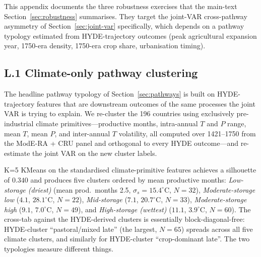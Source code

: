 \documentclass[11pt,letterpaper]{article}
\begin{document}
This appendix documents the three robustness exercises that the main-text Section~\ref{sec:robustness} summarises. They target the joint-VAR cross-pathway asymmetry of Section~\ref{sec:joint-var} specifically, which depends on a pathway typology estimated from HYDE-trajectory outcomes (peak agricultural expansion year, 1750-era density, 1750-era crop share, urbanisation timing).

\subsection*{L.1 Climate-only pathway clustering}
\label{app:joint-var-climate-clusters}

The headline pathway typology of Section~\ref{sec:pathways} is built on HYDE-trajectory features that are downstream outcomes of the same processes the joint VAR is trying to explain. We re-cluster the 196 countries using exclusively pre-industrial climate primitives---productive months, intra-annual $T$ and $P$ range, mean $T$, mean $P$, and inter-annual $T$ volatility, all computed over 1421--1750 from the ModE-RA + CRU panel and orthogonal to every HYDE outcome---and re-estimate the joint VAR on the new cluster labels.

K=5 KMeans on the standardised climate-primitive features achieves a silhouette of $0.340$ and produces five clusters ordered by mean productive months: \emph{Low-storage (driest)} (mean prod.\ months 2.5, $\sigma_s = 15.4^\circ$C, $N=32$), \emph{Moderate-storage low} ($4.1$, $28.1^\circ$C, $N=22$), \emph{Mid-storage} ($7.1$, $20.7^\circ$C, $N=33$), \emph{Moderate-storage high} ($9.1$, $7.0^\circ$C, $N=49$), and \emph{High-storage (wettest)} ($11.1$, $3.9^\circ$C, $N=60$). The cross-tab against the HYDE-derived clusters is essentially block-diagonal-free: HYDE-cluster ``pastoral/mixed late'' (the largest, $N=65$) spreads across all five climate clusters, and similarly for HYDE-cluster ``crop-dominant late''. The two typologies measure different things.
\end{document}
